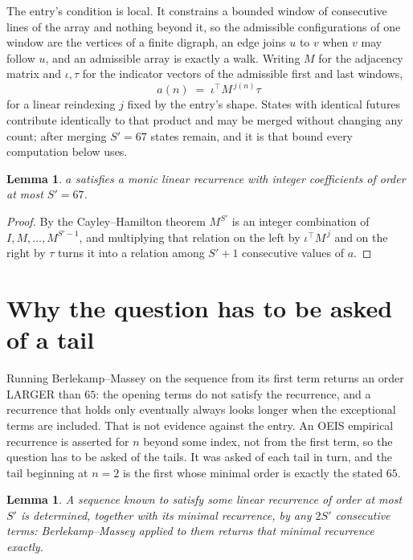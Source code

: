\documentclass[11pt,a4paper]{article}
\theoremstyle{plain}
\newtheorem{lemma}[theorem]{Lemma}
\theoremstyle{definition}
\begin{document}
The entry's condition is local. It constrains a bounded window of consecutive lines of the
array and nothing beyond it, so the admissible configurations of one window are the vertices of
a finite digraph, an edge joins $u$ to $v$ when $v$ may follow $u$, and an admissible array is
exactly a walk. Writing $M$ for the adjacency matrix and $\iota,\tau$ for the indicator vectors
of the admissible first and last windows,
\[
a(n)\;=\;\iota^{\!\top}M^{\,j(n)}\tau
\]
for a linear reindexing $j$ fixed by the entry's shape. States with identical futures
contribute identically to that product and may be merged without changing any count; after
merging $S'=67$ states remain, and it is that bound every computation below uses.

\begin{lemma}\label{lem:cf}
$a$ satisfies a monic linear recurrence with integer coefficients of order at most $S'=67$.
\end{lemma}

\begin{proof}
By the Cayley--Hamilton theorem $M^{S'}$ is an integer combination of $I,M,\dots,M^{S'-1}$,
and multiplying that relation on the left by $\iota^{\!\top}M^{\,j}$ and on the right by
$\tau$ turns it into a relation among $S'+1$ consecutive values of $a$.
\end{proof}

\section{Why the question has to be asked of a tail}

Running Berlekamp--Massey on the sequence from its first term returns an order LARGER than $65$: the opening terms do not satisfy the recurrence, and a recurrence that holds only eventually always looks longer when the exceptional terms are included. That is not evidence against the entry. An OEIS empirical recurrence is asserted for $n$ beyond some index, not from the first term, so the question has to be asked of the tails. It was asked of each tail in turn, and the tail beginning at $n=2$ is the first whose minimal order is exactly the stated $65$.

\begin{lemma}\label{lem:bm}
A sequence known to satisfy some linear recurrence of order at most $S'$ is determined,
together with its minimal recurrence, by any $2S'$ consecutive terms: Berlekamp--Massey applied
to them returns that minimal recurrence exactly.
\end{lemma}
\end{document}
